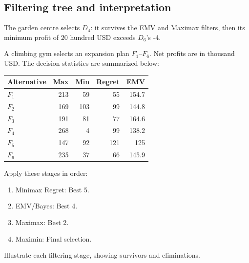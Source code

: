 \subsection*{Filtering tree and interpretation}
\begin{center}
\end{center}
The garden centre selects $D_4$: it survives the EMV and Maximax filters, then its minimum profit of 20 hundred USD exceeds $D_6$'s -4.
\secInicio[sec:q3]

A climbing gym selects an expansion plan $F_1$--$F_6$. Net profits are in thousand USD. The decision statistics are summarized below:
\vspace{-3mm}
\begin{center}\small\setlength{\tabcolsep}{4pt}
	\begin{tabular}{lrrrr}\toprule
		Alternative & Max & Min & Regret & EMV\\ \midrule
		$F_1$ & 213 & 59 & 55 & 154.7\\
		$F_2$ & 169 & 103 & 99 & 144.8\\
		$F_3$ & 191 & 81 & 77 & 164.6\\
		$F_4$ & 268 & 4 & 99 & 138.2\\
		$F_5$ & 147 & 92 & 121 & 125\\
		$F_6$ & 235 & 37 & 66 & 145.9\\
		\bottomrule
	\end{tabular}
\end{center}
\vspace{-3mm}
Apply these stages in order:
\begin{enumerate}[leftmargin=*]
	\item Minimax Regret: Best 5.
	\item EMV/Bayes: Best 4.
	\item Maximax: Best 2.
	\item Maximin: Final selection.
\end{enumerate}
Illustrate each filtering stage, showing survivors and eliminations.
\label{sol:q4table}
